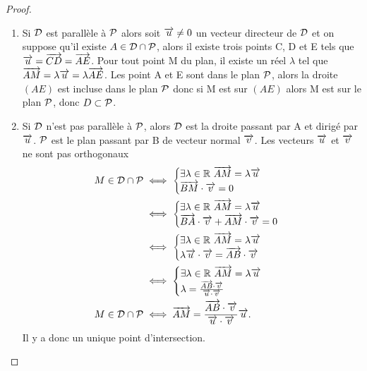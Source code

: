 \begin{proof}
  \begin{enumerate}
    \item Si \(\Dr\) est parallèle à \(\P\) alors soit \(\vu\neq 0\) un 
      vecteur directeur de \(\Dr\) et on suppose qu'il existe 
      \(A\in\Dr\cap\P\), alors il existe trois points C, D et E tels que \(\vu 
      = \vect{CD} = \vect{AE}\).  Pour tout point M du plan, il existe un réel 
      \(\lambda\) tel que \(\vect{AM} = \lambda\vu = \lambda\vect{AE}\). Les 
      point A et E sont dans le plan \(\P\), alors la droite \((AE)\) est 
      incluse dans le plan \(\P\) donc si M est sur \((AE)\) alors M est sur 
      le plan \(\P\), donc \(D \subset \P\).
    \item Si \(\Dr\) n'est pas parallèle à \(\P\), alors \(\Dr\) est la droite 
      passant par A et dirigé par \(\vu\). \(\P\) est le plan passant par B de 
      vecteur normal \(\vv\). Les vecteurs \(\vu\) et \(\vv\) ne sont pas 
      orthogonaux
      \begin{align}
        M \in \Dr\cap\P 
        & \iff 
        \begin{cases}
          \exists \lambda \in \R \ \vect{AM} = \lambda\vu \\ 
          \vect{BM}\cdot\vv = 0
        \end{cases} \\
        & \iff 
        \begin{cases}
          \exists \lambda \in \R \ \vect{AM} = \lambda\vu \\ 
          \vect{BA}\cdot\vv + \vect{AM}\cdot\vv = 0
        \end{cases}\\
        & \iff
        \begin{cases}
          \exists \lambda \in \R \ \vect{AM} = \lambda\vu \\
          \lambda\vu\cdot\vv = \vect{AB}\cdot\vv
        \end{cases}\\
        & \iff
        \begin{cases}
          \exists \lambda \in \R \ \vect{AM} = \lambda\vu \\
          \lambda = \frac{\vect{AB}\cdot\vv}{\vu\cdot\vv}
        \end{cases}\\          
        M \in \Dr\cap\P &\iff \vect{AM} = 
        \frac{\vect{AB}\cdot\vv}{\vu\cdot\vv}\vu.
      \end{align}
      Il y a donc un unique point d'intersection.
  \end{enumerate}
\end{proof}

